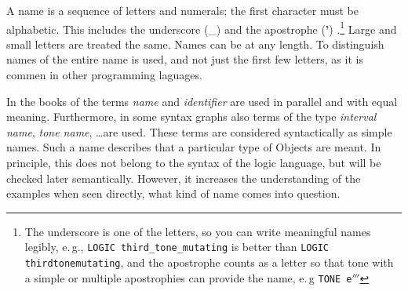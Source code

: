 A name  is a sequence of
letters and numerals; the
first character must be alphabetic. This includes
the underscore (\_)  and the apostrophe
({\bf'}) .\footnote {The underscore is one of the letters, so
you can write meaningful names legibly, e.\,g.,
{\tt LOGIC third\_tone\_mutating} is better than
{\tt LOGIC thirdtonemutating},
and the apostrophe counts as a letter
so that tone with a simple or multiple apostrophies can
provide the name, e.\,g {\tt TONE e${}'''$}}
Large and small letters are treated the same.
Names can be at any length.
To distinguish names of the entire name is used,
and not just the first few letters, as it is commen in other
programming laguages.
\iffalse
Ein Name\index{Namen} besteht aus einer Folge von
Buchstaben und Ziffern;  das
erste Zeichen muss ein Buchstabe sein.  Dabei zählen
der Unterstrich  (\_)\index{\_ (Unterstrich)} und der Apostroph
({\bf '})\index{#' (Apostroph)}
zu den Buchstaben.\footnote{Der Unterstrich zählt zu den Buchstaben, damit
man aussagekräftige Namen gut lesbar schreiben kann, z.\,B.
{\tt LOGIK Drittel\_Ton\_Mutierend} ist besser als
{\tt LOGIK dritteltonmutierend}
und der Apostroph zählt als Buchstabe,
damit man Töne mit einfach oder mehrfach gestrichenen
Namen versehen kann, z.\,B. {\tt TON e${}'''$ }}
Große und kleine Buchstaben werden gleich behandelt.
Namen können beliebig lang sein.
Zur  Unterscheidung von Namen wird der gesamte Name herangezogen,
und nicht nur die ersten paar Buchstaben, wie dies bei anderen
Programmiersprachen üblich ist\index{Signifikanz}.
\fi

In the books of \mutabor{} the terms {\it name} 
and {\it identifier} are
used in parallel and with equal meaning. Furthermore, in some
syntax graphs also terms of the type {\it interval name}, {\it tone
  name}, \ldots are
used. These terms are considered syntactically as simple names.
Such a name describes that a particular type of
Objects are meant. In principle, this does not belong to the syntax
of the logic language, but will be checked later semantically. However, it increases
the understanding of the examples when seen directly, what kind of name
comes into question.
\iffalse
In den Büchern von \mutabor{} werden die Begriffe {\it Name}\index{Namen}
und {\it Bezeichner}\index{Bezeichner}
parallel und mit gleicher Bedeutung verwendet. Ferner werden bei einigen
Syntaxgraphen auch Begriffe der Art {\it Intervallname}, {\it Tonname},\ldots
verwendet. Diese Begriffe sind syntaktisch gesehen einfache Namen.
Es soll damit zum Ausdruck kommen, daß Namen einer bestimmten Art von
Objekten gemeint sind. Dies gehört prinzipiell nicht zur Syntax der
Logiksprache, sondern wird erst später semantisch überprüft. Es erhöht
jedoch das Verständnis, wenn direkt erkennbar ist, welche Art von Namen
in Frage kommt.
\fi

